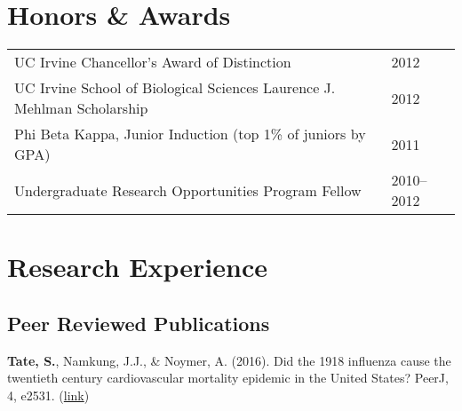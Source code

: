 \documentclass[letterpaper]{article}
\newcommand{\newlineb}                 %
    {
      \newline 
      \small                           %
      \hspace{0.30cm}                  %
      $\bullet$                        %
      }
\renewenvironment{itemize}{
  \begin{list}{}{
    \setlength{\leftmargin}{0.3cm}
    \setlength{\rightmargin}{0.3cm}
    \setlength{\parskip}{0cm}
  }
}{
  \end{list}}
\begin{document}


\section*{Honors \& Awards \hrulefill} 
\begin{tabular}{L{14.5 cm}R{2.0 cm}}


UC Irvine Chancellor's Award of Distinction
& 2012\\
  
UC Irvine School of Biological Sciences Laurence J. Mehlman Scholarship 
& 2012\\

Phi Beta Kappa, Junior Induction (top 1\% of juniors by GPA) & 2011\\

Undergraduate Research Opportunities Program Fellow & 2010--2012\\


\end{tabular}


\section*{Research Experience \hrulefill}
\subsection*{Peer Reviewed Publications}

\begin{itemize}
\item {\bf Tate, S.}, Namkung, J.J., \& Noymer, A. (2016). Did the 1918 influenza cause the twentieth century cardiovascular mortality epidemic in the United States? PeerJ, 4, e2531. (\href{https://doi.org/10.7717/peerj.2531}{link})
\end{itemize}
\end{document}
